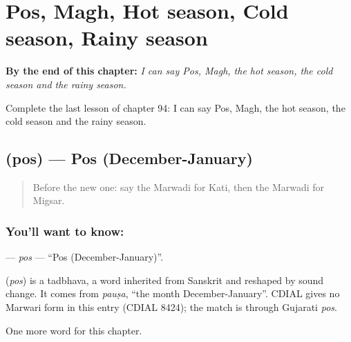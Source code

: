 
\chapter{Pos, Magh, Hot season, Cold season, Rainy season}
\label{ch:mw-pos-magh-hot-season-cold-season-rainy-season}

\begin{chapteropening}
\textbf{By the end of this chapter:} \emph{I can say Pos, Magh, the hot season, the cold season and the rainy season.}

Complete the last lesson of chapter 94: I can say Pos, Magh, the hot season, the cold season and the rainy season.
\end{chapteropening}

\section[\texorpdfstring{\mw{पोस} (pos)}{पोस (pos)}]{ (pos) — Pos (December-January)}

\label{lesson:MW-C94-pos}



\begin{quote}
Before the new one: say the Marwadi for Kati, then the Marwadi for Migsar.
\end{quote}

\subsection*{You'll want to know: }
\textbf{} — \emph{pos} — \textquotedblleft{}Pos (December-January)\textquotedblright{}.

\begin{cousinweb}
\textbf{} (\emph{pos}) is a tadbhava, a word inherited from Sanskrit and reshaped by sound change. It comes from \emph{pauṣa}, \textquotedblleft{}the month December-January\textquotedblright{}. CDIAL gives no Marwari form in this entry (CDIAL 8424); the match is through Gujarati \emph{pos}.
\end{cousinweb}

\begin{grammarlens}[title={What you've built}]
One more word for this chapter.
\end{grammarlens}


